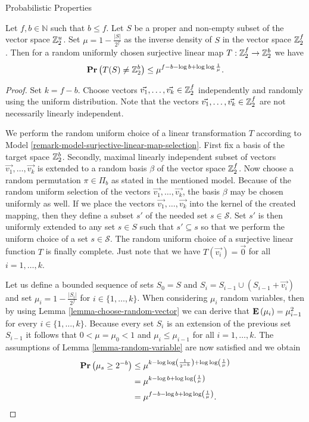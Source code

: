 \begin{section}{Probabilistic Properties}
\begin{theorem}
\label{theorem-linear-function-set-onto}
Let $f, b \in \mathbb{N}$ such that $b \leq f$. Let $S$ be a proper and non-empty subset of the vector space $\mathbb{Z}_{2}^{u}$. Set $\mu = 1 - \frac{|S|}{2 ^ f}$ as the inverse density of $S$ in the vector space $\mathbb{Z}_{2}^{f}$. Then for a random uniformly chosen surjective linear map $T: \mathbb{Z}_{2}^{f} \rightarrow \mathbb{Z}_{2}^{b}$ we have
\[
	\mathbf{Pr}\left(T(S) \neq \mathbb{Z}_{2}^{b}\right) \leq \mu^{f - b - \log b + \log \log \frac{1}{\mu}} \text{.}
\]
\end{theorem}
\begin{proof}
Set $k = f - b$. Choose vectors $\vec{v_1}, \dots, \vec{v_k} \in \mathbb{Z}_{2}^{f}$ independently and randomly using the uniform distribution. Note that the vectors $\vec{v_1}, \dots, \vec{v_k} \in \mathbb{Z}_{2}^{f}$ are not necessarily linearly independent.

We perform the random uniform choice of a linear transformation $T$ according to Model \ref{remark-model-surjective-linear-map-selection}. First fix a basis of the target space $\mathbb{Z}_{2}^{b}$. Secondly, maximal linearly independent subset of vectors $\vec{v_1}, \dots, \vec{v_k}$ is extended to a random basis $\beta$ of the vector space $\mathbb{Z}_{2}^{f}$. Now choose a random permutation $\pi \in \Pi_b$ as stated in the mentioned model. Because of the random uniform selection of the vectors $\vec{v_1}, \dots, \vec{v_k}$, the basis $\beta$ may be chosen uniformly as well. If we place the vectors $\vec{v_1}, \dots, \vec{v_k}$ into the kernel of the created mapping, then they define a subset $s'$ of the needed set $s \in \mathcal{S}$. Set $s'$ is then uniformly extended to any set $s \in S$ such that $s' \subseteq s$ so that we perform the uniform choice of a set $s \in \mathcal{S}$. The random uniform choice of a surjective linear function $T$ is finally complete. Just note that we have $T(\vec{v_i}) = \vec{0}$ for all $i = 1, \dots, k$.	

Let us define a bounded sequence of sets $S_0 = S$ and $S_i = S_{i - 1} \cup (S_{i - 1} + \vec{v_i})$ and set $\mu_i = 1 - \frac{|S_i|}{2 ^ f}$ for $i \in \{ 1, \dots, k \}$. When considering $\mu_i$ random variables, then by using Lemma \ref{lemma-choose-random-vector}  we can derive that $\mathbf{E}\left(\mu_i\right) = \mu_{i - 1} ^ 2$ for every $i \in \{1, \dots, k \}$. Because every set $S_i$ is an extension of the previous set $S_{i - 1}$ it follows that $0 < \mu = \mu_0 < 1$ and $\mu_i \leq \mu_{i - 1}$ for all $i = 1, \dots, k$. The assumptions of Lemma \ref{lemma-random-variable} are now satisfied and we obtain
\[
\begin{split}
\mathbf{Pr}\left(\mu_s \geq 2 ^ {-b}\right) 
	& \leq \mu ^ {k - \log \log \left(\frac{1}{2 ^ {-b}}\right) + \log \log \left( \frac{1}{\mu} \right)} \\
	& = \mu ^ {k - \log b + \log \log \left(\frac{1}{\mu}\right)} \\
	& = \mu ^ {f - b - \log b + \log \log \left(\frac{1}{\mu}\right)} \text{.}
\end{split}
\]


\end{proof}
\end{section}
